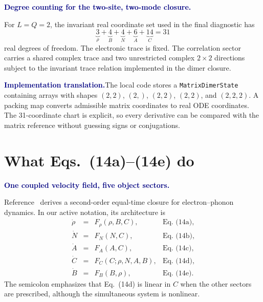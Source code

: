 \documentclass[10pt]{article}
\newcommand{\pedbox}[2]{%
  \par\medskip
  \noindent\colorbox{pale}{%
    \parbox{\dimexpr\linewidth-2\fboxsep\relax}{%
      \textcolor{navy}{\textbf{#1}}\quad #2%
    }%
  }\par\medskip
}
\newcommand{\implementationbox}[1]{\pedbox{Implementation translation.}{#1}}
\newcommand{\flowlead}[1]{%
  \par\medskip
  \needspace{3\baselineskip}%
  \noindent\textcolor{navy}{\textbf{#1.}}\enspace\ignorespaces
}
\begin{document}
\flowlead{Degree counting for the two-site, two-mode closure}

For \(L=Q=2\), the invariant real coordinate set used in the final
diagnostic has
\[
\underbrace{3}_{\rho}
+\underbrace{4}_{B}
+\underbrace{4}_{N}
+\underbrace{6}_{A}
+\underbrace{14}_{C}
=31
\]
real degrees of freedom.  The electronic trace is fixed.  The correlation
sector carries a shared complex trace and two unrestricted complex
\(2\times2\) directions subject to the invariant trace relation implemented
in the dimer closure.

\implementationbox{The local code stores a
\texttt{MatrixDimerState} containing arrays with shapes
\((2,2)\), \((2,)\), \((2,2)\), \((2,2)\), and \((2,2,2)\).  A packing map
converts admissible matrix coordinates to real ODE coordinates.  The
31-coordinate chart is explicit, so every derivative can be compared with
the matrix reference without guessing signs or conjugations.}

\part{What Eqs.~(14a)--(14e) do}

\flowlead{One coupled velocity field, five object sectors}

Reference~\cite{riva2026} derives a second-order equal-time closure for
electron--phonon dynamics.  In our active notation, its architecture is
\[
\begin{array}{rcll}
\dot\rho&=&F_\rho(\rho,B,C),&\text{Eq.~(14a)},\\
\dot N&=&F_N(N,C),&\text{Eq.~(14b)},\\
\dot A&=&F_A(A,C),&\text{Eq.~(14c)},\\
\dot C&=&F_C(C;\rho,N,A,B),&\text{Eq.~(14d)},\\
\dot B&=&F_B(B,\rho),&\text{Eq.~(14e)}.
\end{array}
\]
The semicolon emphasizes that Eq.~(14d) is linear in \(C\) when the other
sectors are prescribed, although the simultaneous system is nonlinear.
\end{document}
